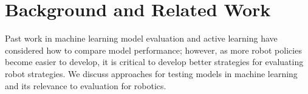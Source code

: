 \section{Background and Related Work}

Past work in machine learning model evaluation and active learning have considered how to compare model performance; however, as more robot policies become easier to develop, it is critical to develop better strategies for evaluating robot strategies.
We discuss approaches for testing models in machine learning and its relevance to evaluation for robotics.








